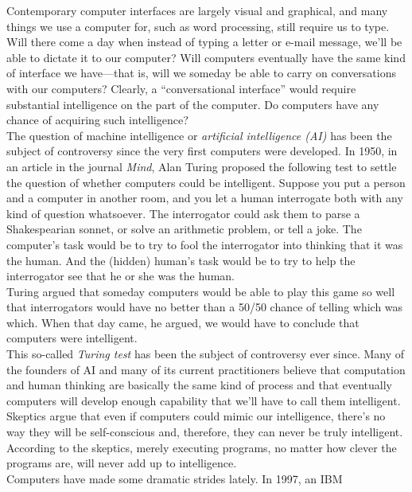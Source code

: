 Contemporary computer interfaces are largely visual and graphical, and
many things we use a computer for, such as word processing, still
require us to type. Will there come a day when instead of typing a
letter or e-mail message, we'll be able to dictate it to our computer?
Will computers eventually have the same kind of interface we have---that is, will 
we someday be able to carry on conversations with our
computers?  Clearly, a ``conversational interface'' would require
substantial intelligence on the part of the computer. Do computers
have any chance of acquiring such intelligence?\\
\hspace*{1pc}The question of machine intelligence or {\it artificial intelligence
(AI)} has been the subject of controversy since the very first
computers were developed. In 1950, in an article in the journal {\it
Mind}, Alan Turing proposed the following test to settle the question
of whether computers could be intelligent. Suppose you put a person
and a computer in another room, and you let a human interrogate both
with any kind of question whatsoever. The interrogator could ask them
to parse a Shakespearian sonnet, or solve an arithmetic problem, or
tell a joke. The computer's task would be to try to fool the
interrogator into thinking that it was the human. And the (hidden)
human's task would be to try to help the interrogator see that he or
she was the human.\\
\hspace*{1pc}Turing argued that someday computers would be able to play this game
so well that interrogators would have no better than a 50/50 chance of
telling which was which. When that day came, he argued, we would have
to conclude that computers were intelligent.\\
\hspace*{1pc}This so-called {\it Turing test} has been the subject of controversy ever
since.  Many of the founders of AI and many of its current
practitioners believe that computation and human thinking are
basically the same kind of process and that eventually computers will
develop enough capability that we'll have to call them intelligent.
Skeptics argue that even if computers could mimic our intelligence,
there's no way they will be self-conscious and, therefore, they can
never be truly intelligent. According to the skeptics, merely
executing programs, no matter how clever the programs are, will never
add up to intelligence.\\
\hspace*{1pc}Computers have made some dramatic strides lately. In 1997, an IBM
